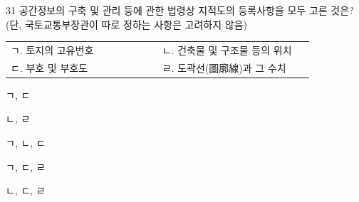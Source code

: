 \begin{question}{31}
공간정보의 구축 및 관리 등에 관한 법령상 지적도의 등록사항을 모두 고른 것은? (단, 국토교통부장관이 따로 정하는 사항은 고려하지 않음)
\begin{framedtext}
\begin{tabular}{@{}p{0.46\linewidth}p{0.46\linewidth}@{}}
ㄱ. 토지의 고유번호 & ㄴ. 건축물 및 구조물 등의 위치 \\
ㄷ. 부호 및 부호도 & ㄹ. 도곽선(圖廓線)과 그 수치
\end{tabular}
\end{framedtext}
\begin{choices}
  \item ㄱ, ㄷ
  \item ㄴ, ㄹ
  \item ㄱ, ㄴ, ㄷ
  \item ㄱ, ㄷ, ㄹ
  \item ㄴ, ㄷ, ㄹ
\end{choices}
\end{question}
